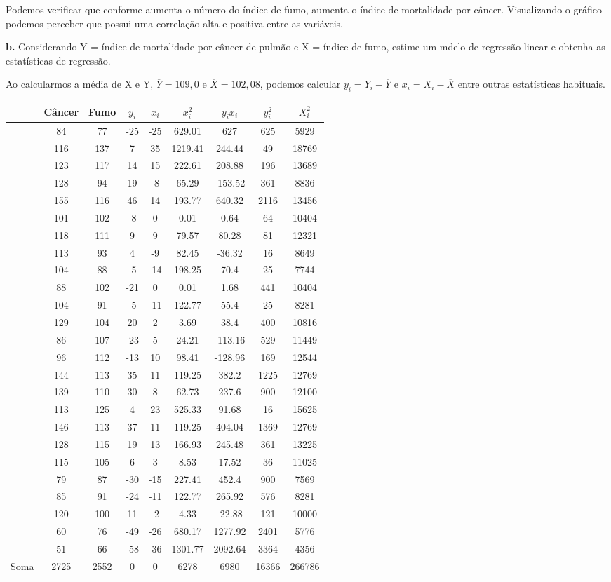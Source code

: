 \documentclass[
  openany]{book}
\begin{document}
Podemos verificar que conforme aumenta o número do índice de fumo, aumenta o índice de mortalidade por câncer. Visualizando o gráfico podemos perceber que possui uma correlação alta e positiva entre as variáveis.

\textbf{b.} Considerando Y = índice de mortalidade por câncer de pulmão e X = índice de fumo, estime um mdelo de regressão linear e obtenha as estatísticas de regressão.

Ao calcularmos a média de X e Y, \(\overline{Y}=109,0\) e \(\overline{X}=102,08\), podemos calcular \(y_i=Y_i-\overline{Y}\) e \(x_i=X_i-\overline{X}\) entre outras estatísticas habituais.

\begin{longtable}[]{@{}lcccccccc@{}}
\toprule
& Câncer & Fumo & \(y_i\) & \(x_i\) & \(x^2_i\) & \(y_ix_i\) & \(y^2_i\) & \(X^2_i\)\tabularnewline
\midrule
\endhead
& 84 & 77 & -25 & -25 & 629.01 & 627 & 625 & 5929\tabularnewline
& 116 & 137 & 7 & 35 & 1219.41 & 244.44 & 49 & 18769\tabularnewline
& 123 & 117 & 14 & 15 & 222.61 & 208.88 & 196 & 13689\tabularnewline
& 128 & 94 & 19 & -8 & 65.29 & -153.52 & 361 & 8836\tabularnewline
& 155 & 116 & 46 & 14 & 193.77 & 640.32 & 2116 & 13456\tabularnewline
& 101 & 102 & -8 & 0 & 0.01 & 0.64 & 64 & 10404\tabularnewline
& 118 & 111 & 9 & 9 & 79.57 & 80.28 & 81 & 12321\tabularnewline
& 113 & 93 & 4 & -9 & 82.45 & -36.32 & 16 & 8649\tabularnewline
& 104 & 88 & -5 & -14 & 198.25 & 70.4 & 25 & 7744\tabularnewline
& 88 & 102 & -21 & 0 & 0.01 & 1.68 & 441 & 10404\tabularnewline
& 104 & 91 & -5 & -11 & 122.77 & 55.4 & 25 & 8281\tabularnewline
& 129 & 104 & 20 & 2 & 3.69 & 38.4 & 400 & 10816\tabularnewline
& 86 & 107 & -23 & 5 & 24.21 & -113.16 & 529 & 11449\tabularnewline
& 96 & 112 & -13 & 10 & 98.41 & -128.96 & 169 & 12544\tabularnewline
& 144 & 113 & 35 & 11 & 119.25 & 382.2 & 1225 & 12769\tabularnewline
& 139 & 110 & 30 & 8 & 62.73 & 237.6 & 900 & 12100\tabularnewline
& 113 & 125 & 4 & 23 & 525.33 & 91.68 & 16 & 15625\tabularnewline
& 146 & 113 & 37 & 11 & 119.25 & 404.04 & 1369 & 12769\tabularnewline
& 128 & 115 & 19 & 13 & 166.93 & 245.48 & 361 & 13225\tabularnewline
& 115 & 105 & 6 & 3 & 8.53 & 17.52 & 36 & 11025\tabularnewline
& 79 & 87 & -30 & -15 & 227.41 & 452.4 & 900 & 7569\tabularnewline
& 85 & 91 & -24 & -11 & 122.77 & 265.92 & 576 & 8281\tabularnewline
& 120 & 100 & 11 & -2 & 4.33 & -22.88 & 121 & 10000\tabularnewline
& 60 & 76 & -49 & -26 & 680.17 & 1277.92 & 2401 & 5776\tabularnewline
& 51 & 66 & -58 & -36 & 1301.77 & 2092.64 & 3364 & 4356\tabularnewline
Soma & 2725 & 2552 & 0 & 0 & 6278 & 6980 & 16366 & 266786\tabularnewline
\bottomrule
\end{longtable}
\end{document}
